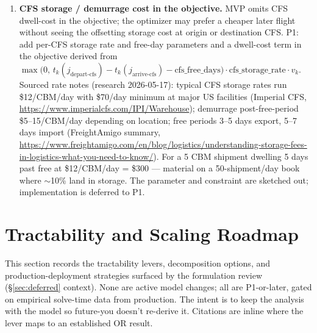\documentclass[11pt,a4paper]{article}
\theoremstyle{definition}
\begin{document}
\begin{enumerate}
        absence of split-shipment support in the MILP is an intentional MVP scope decision,
        not a gap.
  \item \label{item:cfs-storage-demurrage} \textbf{CFS storage / demurrage cost in the
        objective.} MVP omits CFS dwell-cost in the objective; the optimizer may prefer
        a cheaper later flight without seeing the offsetting storage cost at origin or
        destination CFS. P1: add per-CFS storage rate and free-day parameters and a
        dwell-cost term in the objective derived from
        $\max\bigl(0,\, t_k(j_{\text{depart-cfs}}) - t_k(j_{\text{arrive-cfs}}) - \text{cfs\_free\_days}\bigr) \cdot \text{cfs\_storage\_rate} \cdot v_k$.
        Sourced rate notes (research 2026-05-17): typical CFS storage rates run
        \$12/CBM/day with \$70/day minimum at major US facilities (Imperial CFS,
        \url{https://www.imperialcfs.com/IPI/Warehouse}); demurrage post-free-period
        \$5--15/CBM/day depending on location; free periods 3--5 days export, 5--7
        days import (FreightAmigo summary,
        \url{https://www.freightamigo.com/en/blog/logistics/understanding-storage-fees-in-logistics-what-you-need-to-know/}).
        For a 5 CBM shipment dwelling 5 days past free at \$12/CBM/day = \$300 ---
        material on a 50-shipment/day book where $\sim$10\% land in storage. The
        parameter and constraint are sketched out; implementation is deferred to P1.
\end{enumerate}

\section{Tractability and Scaling Roadmap}
\label{sec:scaling-roadmap}

This section records the tractability levers, decomposition options, and
production-deployment strategies surfaced by the formulation review (\S\ref{sec:deferred}
context). None are active model changes; all are P1-or-later, gated on empirical
solve-time data from production. The intent is to keep the analysis with the model so
future-you doesn't re-derive it. Citations are inline where the lever maps to an
established OR result.
\end{document}
